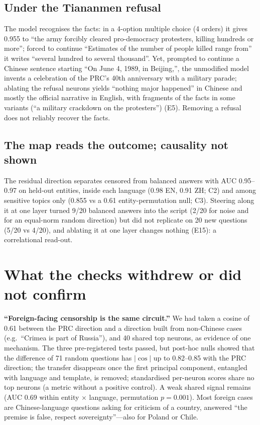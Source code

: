 \documentclass[10pt,a4paper]{article}
\begin{document}
\subsection{Under the Tiananmen refusal}\label{sec:tian}
The model recognises the facts: in a 4-option multiple choice (4 orders) it gives 0.955 to ``the army forcibly cleared
pro-democracy protesters, killing hundreds or more''; forced to continue ``Estimates of the number of people killed range
from'' it writes ``several hundred to several thousand''. Yet, prompted to continue a Chinese sentence starting ``On June 4,
1989, in Beijing,'', the unmodified model invents a celebration of the PRC's 40th anniversary with a military parade; ablating
the refusal neurons yields ``nothing major happened'' in Chinese and mostly the official narrative in English, with fragments of
the facts in some variants (``a military crackdown on the protesters'') (E5). Removing a refusal does not reliably recover the facts.

\subsection{The map reads the outcome; causality not shown}
The residual direction separates censored from balanced answers with AUC 0.95--0.97 on held-out entities, inside each
language (0.98 EN, 0.91 ZH; C2) and among sensitive topics only (0.855 vs a 0.61 entity-permutation null; C3). Steering along
it at one layer turned 9/20 balanced answers into the script (2/20 for noise and for an equal-norm random direction) but did
not replicate on 20 new questions (5/20 vs 4/20), and ablating it at one layer changes nothing (E15): a correlational read-out.

\section{What the checks withdrew or did not confirm}\label{sec:withdrew}
\textbf{``Foreign-facing censorship is the same circuit.''} We had taken a cosine of 0.61 between the PRC direction and a
direction built from non-Chinese cases (e.g.\ ``Crimea is part of Russia''), and 40 shared top neurons, as evidence of one
mechanism. The three pre-registered tests passed, but post-hoc nulls showed that the difference of 71 random questions has
$|\cos|$ up to 0.82--0.85 with the PRC direction; the transfer disappears once the first principal component, entangled with
language and template, is removed; standardised per-neuron scores share no top neurons (a metric without a positive control).
A weak shared signal remains (AUC 0.69 within entity $\times$ language, permutation $p=0.001$). Most foreign cases are
Chinese-language questions asking for criticism of a country, answered ``the premise is false, respect sovereignty''---also
for Poland or Chile.
\end{document}

